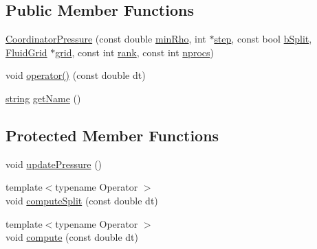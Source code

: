 \subsection*{Public Member Functions}
\begin{DoxyCompactItemize}
\item 
\hyperlink{class_coordinator_pressure_a2adf0d0b7125367d3d8a706062b0ef7c}{Coordinator\+Pressure} (const double \hyperlink{class_coordinator_pressure_abd9e4e2c3495a826d10e8476260f3284}{min\+Rho}, int $\ast$\hyperlink{class_coordinator_pressure_aaba2b69d08c12a6358baf7a4dd0d8666}{step}, const bool \hyperlink{class_coordinator_pressure_a1d8aff04fd9982cf13b3822280d457cd}{b\+Split}, \hyperlink{_definitions_8h_aff3288a3741f5098bcc456bb13440189}{Fluid\+Grid} $\ast$\hyperlink{class_generic_coordinator_aa514bbf7394bb5519c6f12daa33a375a}{grid}, const int \hyperlink{class_coordinator_pressure_a3e290fd1625b1f5940831c4c8ead738c}{rank}, const int \hyperlink{class_coordinator_pressure_ae31ae2e6b1f6a95fb7be1af288adce4e}{nprocs})
\item 
void \hyperlink{class_coordinator_pressure_a49fa217bd91b1e8712861745c066ba53}{operator()} (const double dt)
\item 
\hyperlink{testfpzip_8cpp_a984bb8e04129c4268bd6ff36a50c9fa4}{string} \hyperlink{class_coordinator_pressure_aca5cc16949937915eaa261a1c5ecffd2}{get\+Name} ()
\end{DoxyCompactItemize}
\subsection*{Protected Member Functions}
\begin{DoxyCompactItemize}
\item 
void \hyperlink{class_coordinator_pressure_aae191598a19a01d08447b56db0a103c6}{update\+Pressure} ()
\item 
{\footnotesize template$<$typename Operator $>$ }\\void \hyperlink{class_coordinator_pressure_a91079acd31015eabfa2c85015e1bc044}{compute\+Split} (const double dt)
\item 
{\footnotesize template$<$typename Operator $>$ }\\void \hyperlink{class_coordinator_pressure_a83073ba882150e0f7a483c4bce754772}{compute} (const double dt)
\end{DoxyCompactItemize}
